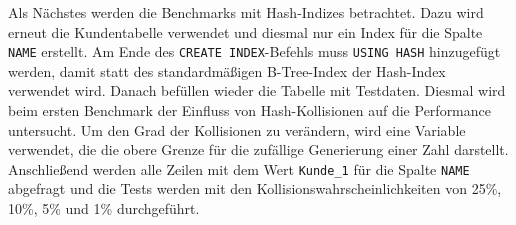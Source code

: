 Als Nächstes werden die Benchmarks mit Hash-Indizes betrachtet.
Dazu wird erneut die Kundentabelle verwendet und diesmal nur ein Index für die Spalte \texttt{NAME} erstellt.
Am Ende des \texttt{CREATE INDEX}-Befehls muss \texttt{USING HASH} hinzugefügt werden, damit statt des standardmäßigen B-Tree-Index der Hash-Index verwendet wird.
Danach befüllen wieder die Tabelle mit Testdaten.
Diesmal wird beim ersten Benchmark der Einfluss von Hash-Kollisionen auf die Performance untersucht.
Um den Grad der Kollisionen zu verändern, wird eine Variable verwendet, die die obere Grenze für die zufällige Generierung einer Zahl darstellt.
Anschließend werden alle Zeilen mit dem Wert \texttt{Kunde\_1} für die Spalte \texttt{NAME} abgefragt und die Tests werden mit den Kollisionswahrscheinlichkeiten von 25\%, 10\%, 5\% und 1\% durchgeführt.

